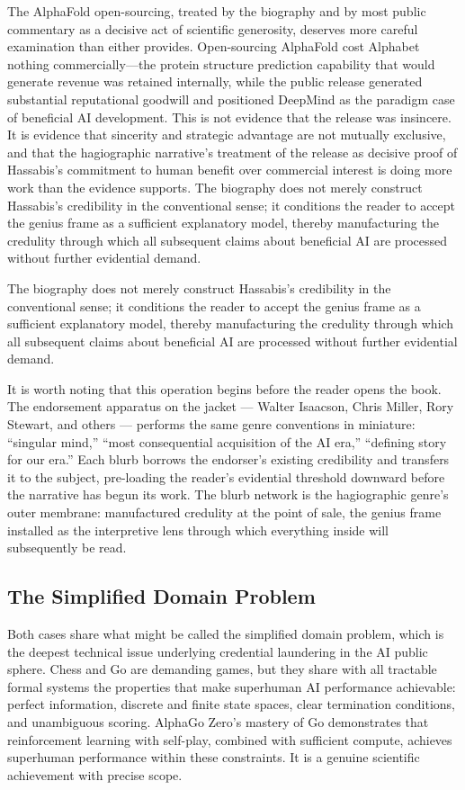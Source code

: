 \documentclass[12pt, a4paper]{article}
\begin{document}
The AlphaFold open-sourcing, treated by the biography and by most public commentary as a decisive
act of scientific generosity, deserves more careful examination than either provides. Open-sourcing
AlphaFold cost Alphabet nothing commercially---the protein structure prediction capability that
would generate revenue was retained internally, while the public release generated substantial
reputational goodwill and positioned DeepMind as the paradigm case of beneficial AI development.
This is not evidence that the release was insincere. It is evidence that sincerity and strategic
advantage are not mutually exclusive, and that the hagiographic narrative's treatment of the
release as decisive proof of Hassabis's commitment to human benefit over commercial interest is
doing more work than the evidence supports. The biography does not merely construct Hassabis's
credibility in the conventional sense; it conditions the reader to accept the genius frame as a
sufficient explanatory model, thereby manufacturing the credulity through which all subsequent
claims about beneficial AI are processed without further evidential demand.

The biography does not merely construct Hassabis's credibility in the conventional sense; it conditions the reader to accept the genius frame as a sufficient explanatory model, thereby manufacturing the credulity through which all subsequent claims about beneficial AI are processed without further evidential demand.

It is worth noting that this operation begins before the reader opens the book. The endorsement apparatus on the jacket --- Walter Isaacson, Chris Miller, Rory Stewart, and others --- performs the same genre conventions in miniature: ``singular mind,'' ``most consequential acquisition of the AI era,'' ``defining story for our era.'' Each blurb borrows the endorser's existing credibility and transfers it to the subject, pre-loading the reader's evidential threshold downward before the narrative has begun its work. The blurb network is the hagiographic genre's outer membrane: manufactured credulity at the point of sale, the genius frame installed as the interpretive lens through which everything inside will subsequently be read.

\subsection{The Simplified Domain Problem}

Both cases share what might be called the simplified domain problem, which is the deepest technical
issue underlying credential laundering in the AI public sphere. Chess and Go are demanding games,
but they share with all tractable formal systems the properties that make superhuman AI performance
achievable: perfect information, discrete and finite state spaces, clear termination conditions,
and unambiguous scoring. AlphaGo Zero's mastery of Go demonstrates that reinforcement learning
with self-play, combined with sufficient compute, achieves superhuman performance within these
constraints. It is a genuine scientific achievement with precise scope.
\end{document}
